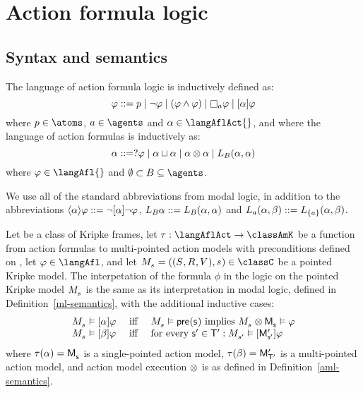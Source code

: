\chapter{Action formula logic}

\section{Syntax and semantics}

\begin{definition}
The language \langAfl{} of action formula logic is inductively defined as:
$$
\phi ::= \atomP \mid 
       \neg \phi \mid
       (\phi \land \phi) \mid
       \necessaryA \phi \mid
       \actionA{\alpha} \phi
$$
where $\atomP \in \atoms$, $\agentA \in \agents$ and $\alpha \in \langAflAct{}$, and where the language \langAflAct{} of action formulas is inductively as:
$$
\alpha ::= \test{\phi} \mid
       \alpha \choice \alpha \mid
       \alpha \compose \alpha \mid
       \learnsBs (\alpha, \alpha)
$$
where $\phi \in \langAfl{}$ and $\emptyset \subset \agentsB \subseteq \agents$.
\end{definition}

We use all of the standard abbreviations from modal logic, in addition to the abbreviations $\actionE{\alpha} \phi ::= \lnot \actionA{\alpha} \lnot \phi$, $\learnsBs \alpha ::= \learnsBs (\alpha, \alpha)$ and $\learnsA (\alpha, \beta) ::= \learns[{\{\agentA\}}] (\alpha, \beta)$.

\begin{definition}
Let \classC{} be a class of Kripke frames, let $\tau : \langAflAct \to \classAmK$ be a function from action formulas to multi-pointed action models with preconditions defined on \langAfl{}, let $\phi \in \langAfl$, and let $\kPModelAndTuple{\kStateS} \in \classC$ be a pointed Kripke model.
The interpetation of the formula $\phi$ in the logic \logicAflC{} on the pointed Kripke model $\kPModel{\kStateS}$ is the same as its interpretation in modal logic, defined in Definition~\ref{ml-semantics}, with the additional inductive cases:
$$
\begin{array}{lcl}
    \kPModel{\kStateS} \entails \actionA{\alpha} \phi & \text { iff } & \kPModel{\kStateS} \entails \aPrecondition(\aStateS) \text{ implies } \kPModel{\kStateS} \exec \aPModel{\aStateS} \entails \phi\\
    \kPModel{\kStateS} \entails \actionA{\beta} \phi & \text { iff } & \text{for every } \aStateSP \in \aStatesTP: \kPModel{\kStateSP} \entails \actionA{\aPModelP{\aStateSP}} \phi
\end{array}
$$
where $\tau(\alpha) = \aPModel{\aStateS}$ is a single-pointed action model, $\tau(\beta) = \aPModelP{\aStatesTP}$ is a multi-pointed action model, and action model execution $\exec$ is as defined in Definition~\ref{aml-semantics}.
\end{definition}

